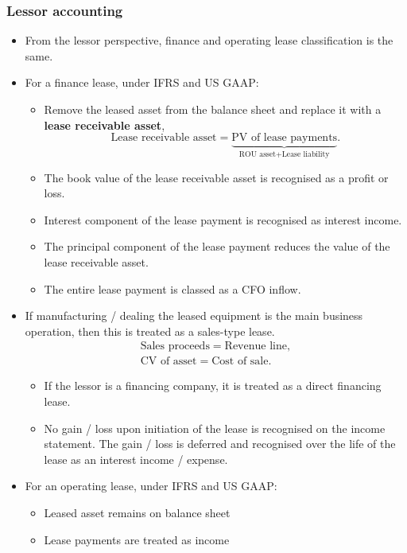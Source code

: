 \documentclass[../notes_compiled.tex]{subfiles}
\begin{document}
\subsubsection{Lessor accounting}
\begin{itemize}
\item From the lessor perspective, finance and operating lease classification is the same.
\item For a finance lease, under IFRS and US GAAP:
\begin{itemize}
\item Remove the leased asset from the balance sheet and replace it with a \textbf{lease receivable asset},
\begin{equation}
\text{Lease receivable asset} = \underbrace{\text{PV of lease payments}}_{\text{ROU asset} + \text{Lease liability}}.
\end{equation}
\item The book value of the lease receivable asset is recognised as a profit or loss.
\item Interest component of the lease payment is recognised as interest income.
\item The principal component of the lease payment reduces the value of the lease receivable asset.
\item The entire lease payment is classed as a CFO inflow.
\end{itemize}
\item If manufacturing / dealing the leased equipment is the main business operation, then this is treated as a sales-type lease. 
\begin{gather*}
\text{Sales proceeds} = \text{Revenue line}, \\
\text{CV of asset} = \text{Cost of sale}.
\end{gather*}
\begin{itemize}
\item If the lessor is a financing company, it is treated as a direct financing lease.
\item No gain / loss upon initiation of the lease is recognised on the income statement. The gain / loss is deferred and recognised over the life of the lease as an interest income / expense.
\end{itemize}
\item For an operating lease, under IFRS and US GAAP:
\begin{itemize}
\item Leased asset remains on balance sheet
\item Lease payments are treated as income

\end{itemize}
\end{itemize}
\end{document}
